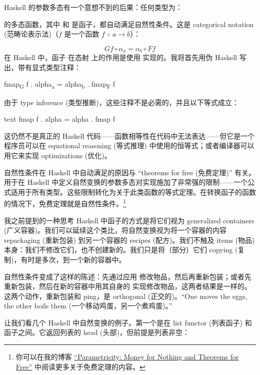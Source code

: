 Haskell 的参数多态有一个意想不到的后果：任何类型为：

的多态函数，其中  和  是函子，都自动满足自然性条件。这是 categorical notation (范畴论表示法)（$f$ 是一个函数 $f \Colon a \to b$）：

\[G f \circ \alpha_a = \alpha_b \circ F f\]
在 Haskell 中，函子  在态射  上的作用是使用  实现的。我将首先用伪 Haskell 写出，带有显式类型注释：

\begin{snipv}
fmap\textsubscript{G} f . alpha\textsubscript{a} = alpha\textsubscript{b} . fmap\textsubscript{F} f
\end{snipv}
由于 type inference (类型推断)，这些注释不是必需的，并且以下等式成立：

\begin{snip}{text}
fmap f . alpha = alpha . fmap f
\end{snip}
这仍然不是真正的 Haskell 代码——函数相等性在代码中无法表达——但它是一个程序员可以在 equational reasoning (等式推理) 中使用的恒等式；或者编译器可以用它来实现 optimizations (优化)。

自然性条件在 Haskell 中自动满足的原因与 ``theorems for free (免费定理)'' 有关。用于在 Haskell 中定义自然变换的参数多态对实现施加了非常强的限制——一个公式适用于所有类型。这些限制转化为关于此类函数的等式定理。在转换函子的函数的情况下，免费定理就是自然性条件。\footnote{
  你可以在我的博客 \href{https://bartoszmilewski.com/2014/09/22/parametricity-money-for-nothing-and-theorems-for-free/}{``Parametricity: Money for Nothing and Theorems for Free''} 中阅读更多关于免费定理的内容。}

我之前提到的一种思考 Haskell 中函子的方式是将它们视为 generalized containers (广义容器)。我们可以延续这个类比，将自然变换视为将一个容器的内容 repackaging (重新包装) 到另一个容器的 recipes (配方)。我们不触及 items (物品) 本身：我们不修改它们，也不创建新的。我们只是将（部分）它们 copying (复制)，有时是多次，到一个新的容器中。

自然性条件变成了这样的陈述：先通过应用  修改物品，然后再重新包装；或者先重新包装，然后在新的容器中用其自身的  实现修改物品，这两者结果是一样的。这两个动作，重新包装和 ping，是 orthogonal (正交的)。“One moves the eggs, the other boils them (一个移动鸡蛋，另一个煮鸡蛋)。”

让我们看几个 Haskell 中自然变换的例子。第一个是在 list functor (列表函子) 和  函子之间。它返回列表的 head (头部)，但前提是列表非空：

